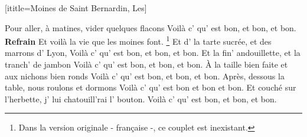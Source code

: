  [ititle={Moines de Saint Bernardin, Les}]

\beginverse
{}
Pour aller, à matines, vider quelques flacons
Voilà c' qu' est bon, et bon, et bon.
\endverse
\beginchorus
\textbf{Refrain}
Et voilà la vie que les moines font. 
\endchorus
\beginverse
{}\footnote{Dans la version originale - française -, ce couplet est inexistant.}
Et d' la tarte sucrée, et des marrons d' Lyon,
Voilà c' qu' est bon, et bon, et bon.
\endverse
\beginverse
{}
Et la fin' andouillette, et la tranch' de jambon
Voilà c' qu' est bon, et bon, et bon.
\endverse
\beginverse
{}
À la taille bien faite et aux nichons bien ronds
Voilà c' qu' est bon, et bon, et bon.
\endverse
\beginverse
{}
Après, dessous la table, nous roulons et dormons
Voilà c' qu' est bon et bon et bon.
\endverse
\beginverse
{}
Et couché sur l'herbette, j' lui chatouill'rai l' bouton.
Voilà c' qu' est bon, et bon, et bon.
\endverse
\endsong
